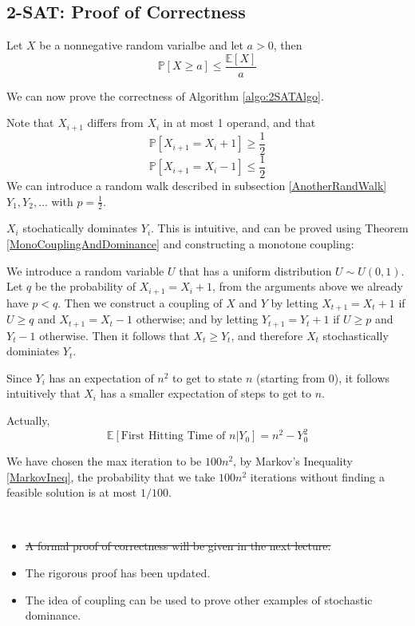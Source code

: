     \subsection{2-SAT: Proof of Correctness}
        \begin{theorem}\label{MarkovIneq}
            Let $X$ be a nonnegative random varialbe and let $a > 0$, then
            \[ \mathbb{P}[X \ge a] \le \frac{\mathbb{E}[X]}{a} \]
        \end{theorem}
        We can now prove the correctness of Algorithm \ref{algo:2SATAlgo}.
        \begin{sketchproof}
            Note that $X_{i+1}$ differs from $X_i$ in at most 1 operand, and that
            \[ \mathbb{P}[X_{i+1} = X_i + 1] \ge \frac{1}{2} \]
            \[ \mathbb{P}[X_{i+1} = X_i - 1] \le \frac{1}{2} \]
            We can introduce a random walk described in subsection \ref{AnotherRandWalk} $Y_1, Y_2, \dots$ with $p = \frac{1}{2}$.

            $X_i$ stochatically dominates $Y_i$. This is intuitive, and can be proved using Theorem \ref{MonoCouplingAndDominance} and constructing a monotone coupling:

            We introduce a random variable $U$ that has a uniform distribution $U \sim U(0,1)$. Let $q$ be the probability of $X_{i+1} = X_i + 1$, from the arguments above we already have $p < q$. Then we construct a coupling of $X$ and $Y$ by letting $X_{t+1} = X_t + 1$ if $U \ge q$ and $X_{t+1} = X_t - 1$ otherwise; and by letting $Y_{t+1} = Y_t + 1$ if $U \ge p$ and $Y_t - 1$ otherwise. Then it follows that $X_t \ge Y_t$, and therefore $X_t$ stochastically dominiates $Y_t$.
            
            Since $Y_i$ has an expectation of $n^2$ to get to state $n$ (starting from $0$), it follows intuitively that $X_i$ has a smaller expectation of steps to get to $n$.

            Actually,
            \[ \mathbb{E}[\text{First Hitting Time of $n$}|Y_0] = n^2 - Y_0^2 \]

            We have chosen the max iteration to be $100n^2$, by Markov's Inequality \ref{MarkovIneq}, the probability that we take $100n^2$ iterations without finding a feasible solution is at most $1/100$.
        \end{sketchproof}
        \begin{remark}~{}
            \begin{itemize}
                \item \sout{A formal proof of correctness will be given in the next lecture.}
                \item The rigorous proof has been updated.
                \item The idea of coupling can be used to prove other examples of stochastic dominance.
            \end{itemize}
        \end{remark}

